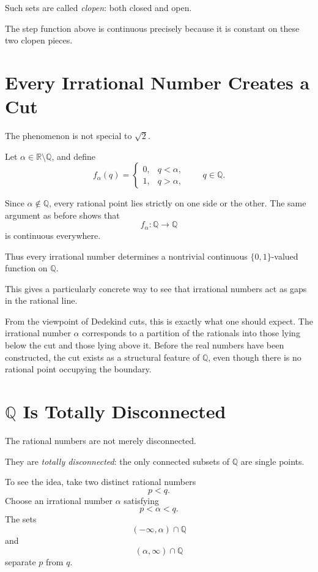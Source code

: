 \documentclass{essay}
\begin{document}
Such sets are called \emph{clopen}: both closed and open.

The step function above is continuous precisely because it is constant on
these two clopen pieces.

\section{Every Irrational Number Creates a Cut}

The phenomenon is not special to \(\sqrt{2}\).

Let \(\alpha\in\mathbb{R}\setminus\mathbb{Q}\), and define
\[
f_\alpha(q)=
\begin{cases}
0,&q<\alpha,\\
1,&q>\alpha,
\end{cases}
\qquad q\in\mathbb{Q}.
\]

Since \(\alpha\notin\mathbb{Q}\), every rational point lies strictly on one
side or the other. The same argument as before shows that
\[
f_\alpha:\mathbb{Q}\to\mathbb{Q}
\]
is continuous everywhere.

Thus every irrational number determines a nontrivial continuous
\(\{0,1\}\)-valued function on \(\mathbb{Q}\).

This gives a particularly concrete way to see that irrational numbers act as
gaps in the rational line.

From the viewpoint of Dedekind cuts, this is exactly what one should expect.
The irrational number \(\alpha\) corresponds to a partition of the rationals
into those lying below the cut and those lying above it. Before the real
numbers have been constructed, the cut exists as a structural feature of
\(\mathbb{Q}\), even though there is no rational point occupying the boundary.

\section{\(\mathbb{Q}\) Is Totally Disconnected}

The rational numbers are not merely disconnected.

They are \emph{totally disconnected}: the only connected subsets of
\(\mathbb{Q}\) are single points.

To see the idea, take two distinct rational numbers
\[
p<q.
\]
Choose an irrational number \(\alpha\) satisfying
\[
p<\alpha<q.
\]
The sets
\[
(-\infty,\alpha)\cap\mathbb{Q}
\]
and
\[
(\alpha,\infty)\cap\mathbb{Q}
\]
separate \(p\) from \(q\).
\end{document}
